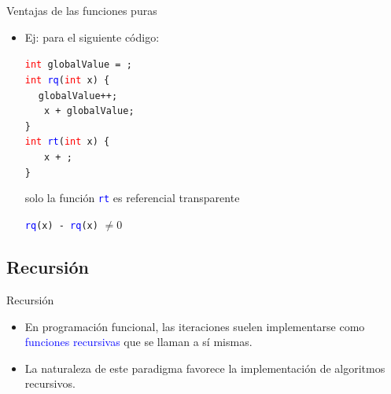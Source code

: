 \documentclass{beamer} %
\newcommand{\blue}[1]{\textcolor{blue}{#1}}
\newcommand{\red}[1]{\textcolor{red}{#1}}
\newcommand{\green}[1]{{\color{green!70!black}{#1}}}
\newcommand{\gray}[1]{{\color{gray!50!white}{#1}}}
\begin{document}
\begin{frame}{Ventajas de las funciones puras}
    \begin{itemize}
        \item Ej: para el siguiente código:
            \medskip
            
            {\footnotesize
            \texttt{\red{int} globalValue = \gray{0};}\\[1.2ex]
            \texttt{\red{int} \blue{rq}(\red{int} x) \{}\\
            $~~~~$ \texttt{globalValue++;}\\
            $~~~~$ \texttt{\green{return} x + globalValue;}\\
            \texttt{\}}\\[1.2ex]
            \texttt{\red{int} \blue{rt}(\red{int} x) \{}\\
            $~~~~$ \texttt{\green{return} x + \gray{1};}\\
            \texttt{\}}
            }
            \medskip\pause
            
            solo la función \texttt{\blue{rt}} es referencial transparente
            \medskip\pause
            
            \texttt{\blue{rq}(x) - \blue{rq}(x)} $\neq 0$
    \end{itemize}
\end{frame}

\subsection{Recursión}

\begin{frame}{Recursión}
    \begin{itemize}
        \item En programación funcional, las iteraciones suelen implementarse como \blue{funciones recursivas} que se llaman a sí mismas.
        \item La naturaleza de este paradigma favorece la implementación de algoritmos recursivos.
    \end{itemize}
\end{frame}
\end{document}
